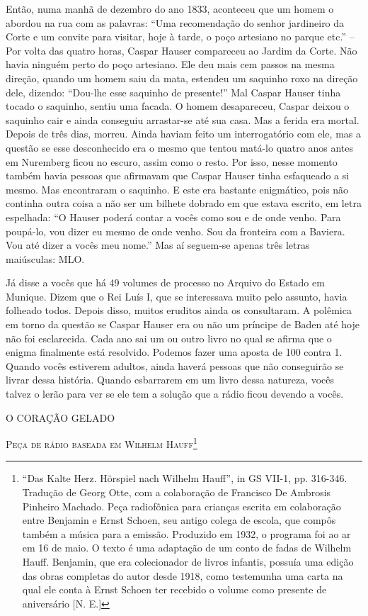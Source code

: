 Então, numa manhã de dezembro do ano 1833, aconteceu que um homem o
abordou na rua com as palavras: ``Uma recomendação do senhor jardineiro
da Corte e um convite para visitar, hoje à tarde, o poço artesiano no
parque etc.'' -- Por volta das quatro horas, Caspar Hauser compareceu ao
Jardim da Corte. Não havia ninguém perto do poço artesiano. Ele deu mais
cem passos na mesma direção, quando um homem saiu da mata, estendeu um
saquinho roxo na direção dele, dizendo: ``Dou-lhe esse saquinho de
presente!'' Mal Caspar Hauser tinha tocado o saquinho, sentiu uma
facada. O homem desapareceu, Caspar deixou o saquinho cair e ainda
conseguiu arrastar-se até sua casa. Mas a ferida era mortal. Depois de
três dias, morreu. Ainda haviam feito um interrogatório com ele, mas a
questão se esse desconhecido era o mesmo que tentou matá-lo quatro anos
antes em Nuremberg ficou no escuro, assim como o resto. Por isso, nesse
momento também havia pessoas que afirmavam que Caspar Hauser tinha
esfaqueado a si mesmo. Mas encontraram o saquinho. E este era bastante
enigmático, pois não continha outra coisa a não ser um bilhete dobrado
em que estava escrito, em letra espelhada: ``O Hauser poderá contar a
vocês como sou e de onde venho. Para poupá-lo, vou dizer eu mesmo de
onde venho. Sou da fronteira com a Baviera. Vou até dizer a vocês meu
nome.'' Mas aí seguem-se apenas três letras maiúsculas: MLO.

Já disse a vocês que há 49 volumes de processo no Arquivo do Estado em
Munique. Dizem que o Rei Luís I, que se interessava muito pelo assunto,
havia folheado todos. Depois disso, muitos eruditos ainda os
consultaram. A polêmica em torno da questão se Caspar Hauser era ou não
um príncipe de Baden até hoje não foi esclarecida. Cada ano sai um ou
outro livro no qual se afirma que o enigma finalmente está resolvido.
Podemos fazer uma aposta de 100 contra 1. Quando vocês estiverem
adultos, ainda haverá pessoas que não conseguirão se livrar dessa
história. Quando esbarrarem em um livro dessa natureza, vocês talvez o
lerão para ver se ele tem a solução que a rádio ficou devendo a vocês.

O CORAÇÃO GELADO

\textsc{Peça de rádio baseada em Wilhelm Hauff}\footnote{``Das Kalte
  Herz. Hörspiel nach Wilhelm Hauff'', in GS VII-1, pp. 316-346.
  Tradução de Georg Otte, com a colaboração de Francisco De Ambrosis
  Pinheiro Machado. Peça radiofônica para crianças escrita em
  colaboração entre Benjamin e Ernst Schoen, seu antigo colega de
  escola, que compôs também a música para a emissão. Produzido em 1932,
  o programa foi ao ar em 16 de maio. O texto é uma adaptação de um
  conto de fadas de Wilhelm Hauff. Benjamin, que era colecionador de
  livros infantis, possuía uma edição das obras completas do autor desde
  1918, como testemunha uma carta na qual ele conta à Ernst Schoen ter
  recebido o volume como presente de aniversário {[}N. E.{]}}

